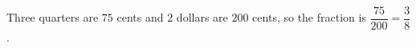 Three quarters are $75$ cents and $2$ dollars are $200$ cents, so the fraction is $\dfrac{75}{200}=\boxed{\dfrac{3}{8}}$.
